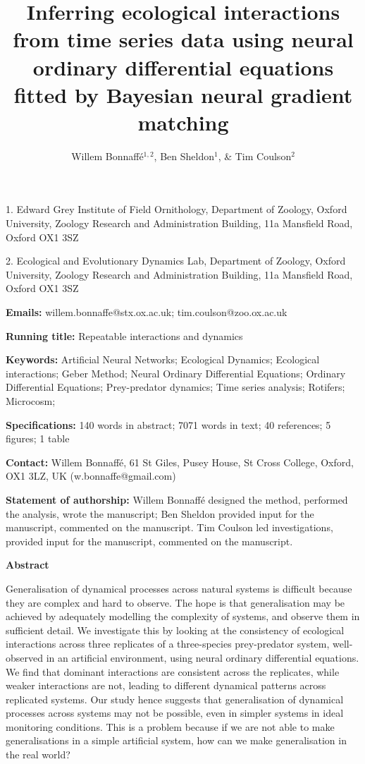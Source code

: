 \documentclass[11pt, oneside]{article}
\title{Inferring ecological interactions from time series data using neural ordinary differential equations fitted by Bayesian neural gradient matching}
\author{Willem Bonnaff\'e$^{1,2}$, Ben Sheldon$^1$, \& Tim Coulson$^2$}
\date{}
\begin{document}
\maketitle
{}

1. Edward Grey Institute of Field Ornithology, Department of Zoology, Oxford University, Zoology Research and Administration Building, 11a Mansfield Road, Oxford OX1 3SZ 

2. Ecological and Evolutionary Dynamics Lab, Department of Zoology, Oxford University, Zoology Research and Administration Building, 11a Mansfield Road, Oxford OX1 3SZ 

\textbf{Emails:}
willem.bonnaffe@stx.ox.ac.uk;
tim.coulson@zoo.ox.ac.uk

\textbf{Running title:}
Repeatable interactions and dynamics

\textbf{Keywords:}
Artificial Neural Networks;
Ecological Dynamics;  
Ecological interactions;
Geber Method; 
Neural Ordinary Differential Equations; 
Ordinary Differential Equations; 
Prey-predator dynamics; 
Time series analysis;
Rotifers;
Microcosm;


\textbf{Specifications:}  140 words in abstract; 7071 words in text; 40 references; 5 figures; 1 table

\textbf{Contact:}
Willem Bonnaff\'e, 61 St Giles, Pusey House, St Cross College, Oxford, OX1 3LZ, UK (w.bonnaffe@gmail.com)

\textbf{Statement of authorship:}
Willem Bonnaff\'e designed the method, performed the analysis, wrote the manuscript; 
Ben Sheldon provided input for the manuscript, commented on the manuscript.
Tim Coulson led investigations, provided input for the manuscript, commented on the manuscript.

\newpage
{}

\textbf{Abstract} 

Generalisation of dynamical processes across natural systems is difficult because they are complex and hard to observe.
The hope is that generalisation may be achieved by adequately modelling the complexity of systems, and observe them in sufficient detail.
We investigate this by looking at the consistency of ecological interactions across three replicates of a three-species prey-predator system, well-observed in an artificial environment, using neural ordinary differential equations.
We find that dominant interactions are consistent across the replicates, while weaker interactions are not, leading to different dynamical patterns across replicated systems.
Our study hence suggests that generalisation of dynamical processes across systems may not be possible, even in simpler systems in ideal monitoring conditions.
This is a problem because if we are not able to make generalisations in a simple artificial system, how can we make generalisation in the real world?
\end{document}
